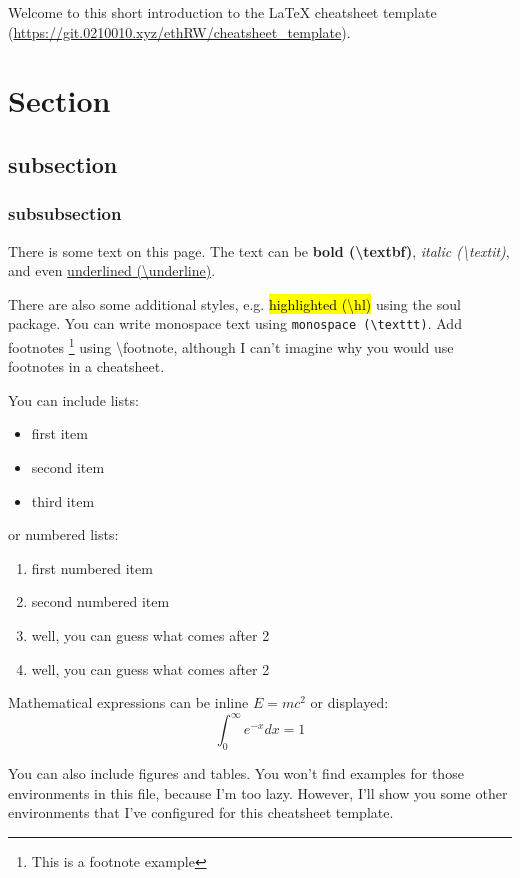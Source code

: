 
Welcome to this short introduction to the LaTeX cheatsheet template (\url{https://git.0210010.xyz/ethRW/cheatsheet_template}).

\section{Section}
\subsection{subsection}
\subsubsection{subsubsection}

There is some text on this page. The text can be \textbf{bold (\textbackslash textbf)}, \textit{italic (\textbackslash textit)}, and even \underline{underlined (\textbackslash underline)}.

There are also some additional styles, e.g. \hl{highlighted (\textbackslash hl)} using the soul package. You can write monospace text using \texttt{monospace (\textbackslash texttt)}. Add footnotes \footnote{This is a footnote example} using \textbackslash footnote, although I can't imagine why you would use footnotes in a cheatsheet.

You can include lists:
\begin{itemize}
    \item first item
    \item second item
    \item third item
\end{itemize}

or numbered lists:
\begin{enumerate}
    \item first numbered item
    \item second numbered item
    \item well, you can guess what comes after 2
    \item well, you can guess what comes after 2
\end{enumerate}

Mathematical expressions can be inline $E=mc^2$ or displayed:
$$
\int_0^\infty e^{-x} dx = 1
$$

You can also include figures and tables. You won't find examples for those environments in this file, because I'm too lazy. However, I'll show you some other environments that I've configured for this cheatsheet template.

